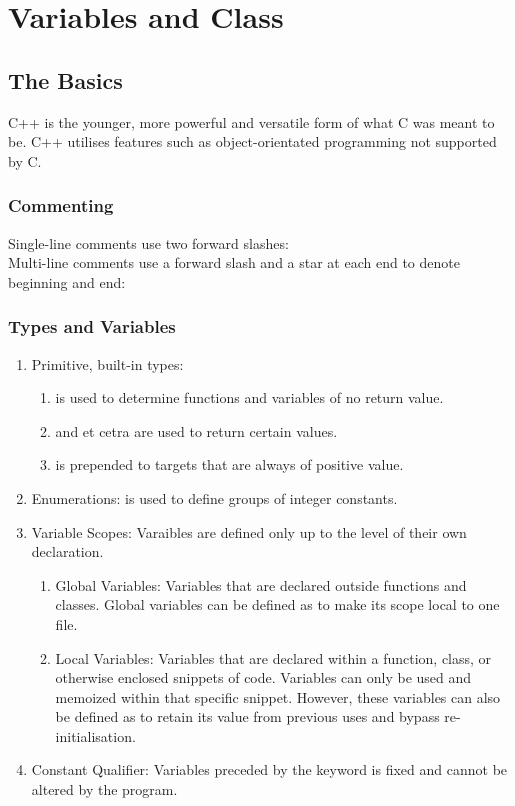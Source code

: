 \chapter{Variables and Class}

\section{The Basics}
C++ is the younger, more powerful and versatile form of what C was meant to be.
C++ utilises features such as object-orientated programming not supported by C.

\subsection{Commenting}
Single-line comments use two forward slashes: \\
Multi-line comments use a forward slash and a star at each end to denote
beginning and end: 

\subsection{Types and Variables}
\begin{enumerate}
\item Primitive, built-in types:
    \begin{enumerate}
    \item {} is used to determine functions and variables of no return
        value.
    \item {} and et cetra are used to return
        certain values.
    \item {} is prepended to targets that are always of positive
        value.
    \end{enumerate}
\item Enumerations:  is used to define groups of integer constants.
\newpage
\item Variable Scopes: Varaibles are defined only up to the level of their own
    declaration.
    \begin{enumerate}
    \item Global Variables: Variables that are declared outside functions and
        classes. Global variables can be defined as  to make its
        scope local to one file.
    \item Local Variables: Variables that are declared within a function, class,
        or otherwise enclosed snippets of code. Variables can only be used and
        memoized within that specific snippet. However, these variables can also
        be defined as  to retain its value from previous uses and
        bypass re-initialisation.
    \end{enumerate}
\item Constant Qualifier: Variables preceded by the keyword  is fixed
    and cannot be altered by the program.
\end{enumerate}
\vspace{\fill}
